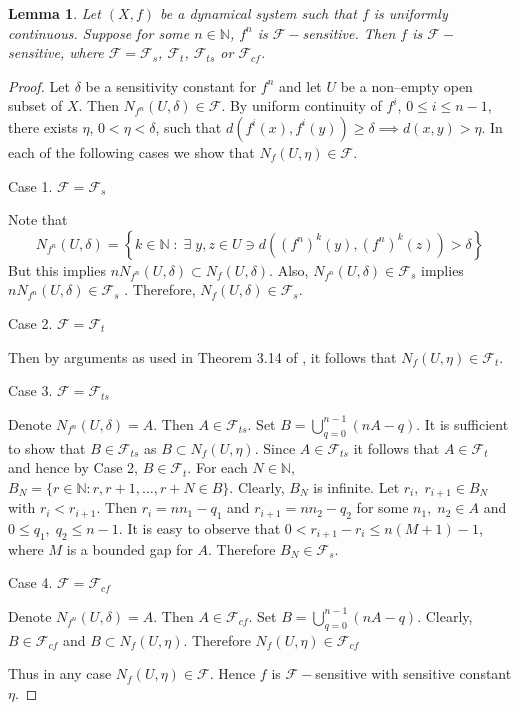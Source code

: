 \documentclass{amsart}[12pt, papera4]
\newtheorem{lemma}[theorem]{Lemma}
\theoremstyle{definition}
\theoremstyle{remark}
\numberwithin{equation}{section}
\def\N{{\mathbb N}}
\def\F{{\mathscr{F}}}
\def\FS{{\mathscr F_s}}
\begin{document}
\begin{lemma}\label{fnf}
	Let $(X,f)$ be a dynamical system such that $f$ is uniformly continuous. Suppose for some $n\in \N$, $f^n$ is $\F-$sensitive. Then $f$ is $\F-$sensitive, where $\F=\F_s$, $\F_t$, $\F_{ts}$ or $\F_{cf}$.
\end{lemma}
\begin{proof}
	Let $\delta$ be a sensitivity constant for $f^n$ and let $U$ be a non--empty open subset of $X$. Then $N_{f^n}(U,\delta)\in \F$. By uniform continuity of $f^i$, $0\leq i\leq n-1$, there exists $\eta$, $0<\eta<\delta$, such that $d(f^i(x),f^i(y))\geq \delta\implies d(x,y)>\eta$. In each of the following cases we show that $N_f(U,\eta)\in \F$.
	
	\medskip			
	\noindent Case 1. $\F=\F_s$
	
	\noindent Note that 
	$$N_{f^n}(U,\delta) = \left\{k\in\N \; : \; \exists \; y,z \in U \ni d\left((f^n)^k(y),(f^n)^k(z)\right) > \delta \right\}$$
	But this implies $n N_{f^n}(U,\delta)\subset N_f(U,\delta)$. Also, $N_{f^n}(U,\delta)\in \FS$ implies $nN_{f^n}(U,\delta)\in \F_s$ \cite[Theorem 3.1]{KP}. Therefore, $N_f(U,\delta)\in \FS$.
	
	\medskip			
	\noindent Case 2. $\F=\F_t$
	
	\noindent Then by arguments as used in Theorem 3.14 of \cite{ES}, it follows that $N_f(U,\eta)\in \F_t$.
	
	\medskip
	\noindent Case 3. $\F=\F_{ts}$
	
	\noindent Denote $N_{f^n}(U,\delta)=A$. Then $A\in \F_{ts}$. Set $B=\bigcup_{q=0}^{n-1}(nA-q).$ It is sufficient to show that $B\in \F_{ts}$ as $B\subset N_f(U,\eta)$. Since $A\in \F_{ts}$ it follows that $A\in \F_t$ and hence by Case 2, $B\in \F_t$. For each $N\in \N$, $B_N=\{r\in \N: r,r+1,\dots, r+N\in B\}$. Clearly, $B_N$ is infinite. Let $r_i, \; r_{i+1}\in B_N$ with $r_i<r_{i+1}$. Then $r_i=nn_1-q_1$ and $r_{i+1}=nn_2-q_2$ for some $n_1, \; n_2 \in A$ and $0\leq q_1, \; q_2 \leq n-1$. It is easy to observe that $0<r_{i+1}-r_i \leq n(M+1)-1$, where $M$ is a bounded gap for $A$. Therefore $B_N\in \F_{s}$.
	
	
	\medskip
	\noindent Case 4. $\F=\F_{cf}$
	
	\noindent Denote $N_{f^n}(U,\delta)=A$. Then $A\in \F_{cf}$. Set $B=\bigcup_{q=0}^{n-1}(nA-q).$ Clearly, $B\in \mathscr{F}_{cf}$ and $B\subset N_f(U,\eta)$. Therefore $N_f(U,\eta)\in  \mathscr{F}_{cf}$
	
	\smallskip
	\noindent Thus in any case $N_f(U,\eta)\in \F$. Hence $f$ is $\F-$sensitive with sensitive constant $\eta$.	
\end{proof}
\end{document}
